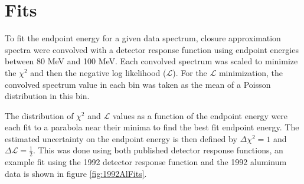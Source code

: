 
\section { Fits }

To fit the endpoint energy for a given data spectrum, closure approximation spectra were convolved with a detector
response function using endpoint energies between 80 MeV and 100 MeV.
Each convolved spectrum was scaled to minimize the $\chi^2$ and then the negative log likelihood ($\mathcal{L}$).
For the $\mathcal{L}$ minimization, the convolved spectrum value in each bin was taken as the mean 
of a Poisson distribution in this bin.



The distribution of $\chi^2$ and $\mathcal{L}$ values as a function of the endpoint energy were each fit to a parabola near 
their minima to find the best fit endpoint energy. The estimated uncertainty on the endpoint energy is then
defined by $\Delta \chi^2 = 1$ and $\Delta \mathcal{L} = \frac{1}{2}$. This was done using both published detector response
functions, an example fit using the 1992 detector response function
and the 1992 aluminum data is shown in figure \ref{fig:1992AlFits}. 

